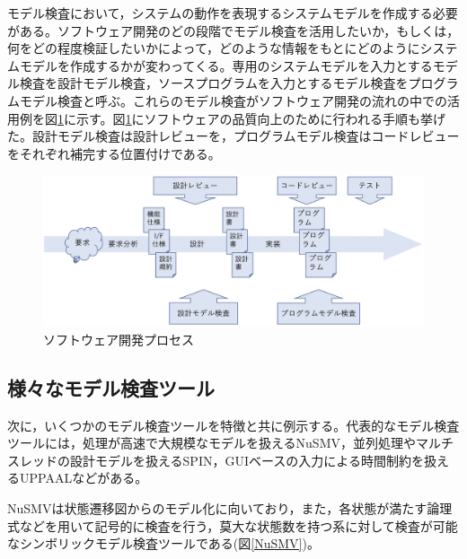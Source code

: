 \documentclass{tpu-sotu}
\begin{document}
	モデル検査において，システムの動作を表現するシステムモデルを作成する必要がある。ソフトウェア開発のどの段階でモデル検査を活用したいか，もしくは，何をどの程度検証したいかによって，どのような情報をもとにどのようにシステムモデルを作成するかが変わってくる。専用のシステムモデルを入力とするモデル検査を設計モデル検査，ソースプログラムを入力とするモデル検査をプログラムモデル検査と呼ぶ。これらのモデル検査がソフトウェア開発の流れの中での活用例を図\ref{develP}に示す。図\ref{develP}にソフトウェアの品質向上のために行われる手順も挙げた。設計モデル検査は設計レビューを，プログラムモデル検査はコードレビューをそれぞれ補完する位置付けである。
	\begin{figure}[htbp]
	\centering
	\includegraphics[width=150mm]{developmentProcess.png}
	\caption{ソフトウェア開発プロセス}
	\label{develP}
	\end{figure}
	\subsection{様々なモデル検査ツール}
	次に，いくつかのモデル検査ツールを特徴と共に例示する。代表的なモデル検査ツールには，処理が高速で大規模なモデルを扱えるNuSMV\cite{Nu}，並列処理やマルチスレッドの設計モデルを扱えるSPIN\cite{s1}，GUIベースの入力による時間制約を扱えるUPPAAL\cite{u2}などがある。
	
	NuSMVは状態遷移図からのモデル化に向いており，また，各状態が満たす論理式などを用いて記号的に検査を行う，莫大な状態数を持つ系に対して検査が可能なシンボリックモデル検査ツールである(図\ref{NuSMV})。
		
\end{document}
